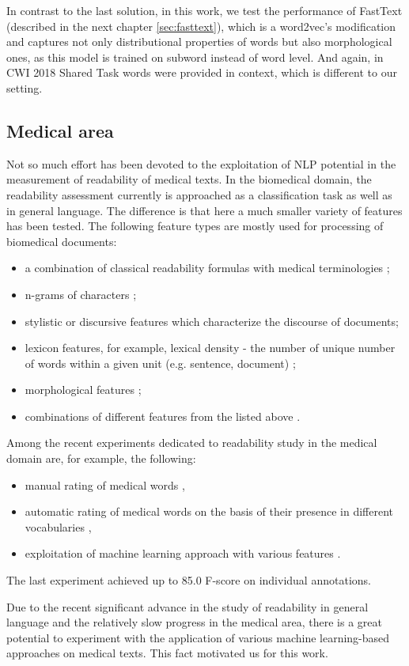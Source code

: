 In contrast to the last solution, in this work, we test the performance of FastText (described in the next chapter \ref{sec:fasttext}), which is a word2vec's modification and captures not only distributional properties of words but also morphological ones, as this model is trained on subword instead of word level. And again, in  CWI 2018 Shared Task words were provided in context, which is different to our setting.


\subsection{Medical area}
Not so much effort has been devoted to the exploitation of NLP potential in the measurement of readability of medical texts.
In the biomedical domain, the readability assessment currently is approached as a classification task as well as in general language. The difference is that here a much smaller variety of features has been tested. The following feature types are mostly used for processing of biomedical documents:
\begin{itemize}
    \item a combination of classical readability formulas
with medical terminologies \citep{Kokkinakis-2006};
    \item n-grams of characters \citep{Poprat-MIE2006}; 
    \item stylistic \citep{Grabar-AMIA2007} or discursive \citep{Goeuriot-LREC2008} features which characterize the discourse of documents;
    \item lexicon features, for example, lexical density - the number of unique number of words within a given unit (e.g. sentence, document) \citep{Miller-HICSS2007};
    \item morphological features \citep{Chmielik-TAL2011};
    \item combinations of different features from the listed above
    \citep{Zeng-MEDINFO2007}.
\end{itemize}

Among the recent experiments dedicated to readability study in the medical domain are, for example, the following: 
\begin{itemize}
    \item manual rating of medical words \citep{Zheng-AMIA2002},
    \item automatic rating of medical words on the basis of their presence in different vocabularies \citep{Borst-MIE2008},
    \item exploitation of machine learning approach
    with various features \citep{Grabar-PITR2014}.
\end{itemize}
The last experiment achieved up to 85.0 F-score on individual annotations.

\bigskip
Due to the recent significant advance in the study of readability in general language and the relatively slow progress in the medical area, there is a great potential to experiment with the application of various machine learning-based approaches on medical texts. This fact motivated us for this work.
